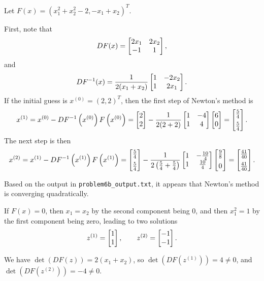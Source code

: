 \documentclass[newpage]{homework}
\begin{document}
\question 
Let $F(x) = (x_1^2 + x_2^2 - 2, -x_1 + x_2)^T$.
\begin{alphaparts}
	\questionpart First, note that
	\begin{equation*}
		DF(x) = \left[\begin{matrix}2x_1 & 2x_2 \\ -1 & 1\end{matrix}\right],
	\end{equation*}
	and
	\begin{equation*}
		DF^{-1}(x) = \frac{1}{2(x_1 + x_2)}\left[\begin{matrix}1 & -2x_2 \\ 1 & 2x_1\end{matrix}\right].
	\end{equation*}
	If the initial guess is $x^{(0)} = (2,2)^T$, then the first step of Newton's method is
	\begin{equation*}
		x^{(1)} = x^{(0)} - DF^{-1}\left(x^{(0)}\right)F\left(x^{(0)}\right) = \left[\begin{matrix}2 \\ 2\end{matrix}\right] - \frac{1}{2(2+2)}\left[\begin{matrix}1 & -4 \\ 1 & 4\end{matrix}\right]\left[\begin{matrix}6 \\ 0\end{matrix}\right] = \left[\begin{matrix}\frac{5}{4} \\[0.5em] \frac{5}{4}\end{matrix}\right].
	\end{equation*}
	The next step is then
	\begin{equation*}
		x^{(2)} = x^{(1)} - DF^{-1}\left(x^{(1)}\right)F\left(x^{(1)}\right) = \left[\begin{matrix}\frac{5}{4} \\[0.5em] \frac{5}{4}\end{matrix}\right] - \frac{1}{2\left(\frac{5}{4} +\frac{5}{4}\right)}\left[\begin{matrix}1 & -\frac{10}{4} \\ 1 & \frac{10}{4}\end{matrix}\right]\left[\begin{matrix}\frac{9}{8} \\[0.5em] 0\end{matrix}\right] = \left[\begin{matrix}\frac{41}{40} \\[0.5em] \frac{41}{40}\end{matrix}\right].
	\end{equation*}
	
	\questionpart Based on the output in \texttt{problem6b\_output.txt}, it appears that Newton's method is converging quadratically.
	
	\questionpart If $F(x) = 0$, then $x_1 = x_2$ by the second component being $0$, and then $x_1^2 = 1$ by the first component being zero, leading to two solutions
	\begin{equation*}
		z^{(1)} = \left[\begin{matrix}1 \\ 1\end{matrix}\right], \qquad z^{(2)} = \left[\begin{matrix}-1 \\ -1\end{matrix}\right].
	\end{equation*}
	
	\questionpart We have $\det(DF(z)) = 2(x_1+x_2)$, so $\det\left(DF\left(z^{(1)}\right)\right) = 4 \ne0$, and $\det\left(DF\left(z^{(2)}\right)\right) = -4 \ne 0$.
\end{alphaparts}
\end{document}

